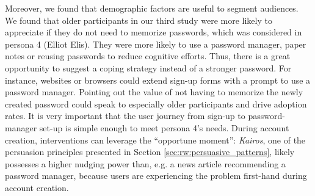 Moreover, we found that demographic factors are useful to segment audiences. We found that older participants in our third study were more likely to appreciate if they do not need to memorize passwords, which was considered in persona 4 (Elliot Elis). They were more likely to use a password manager, paper notes or reusing passwords to reduce cognitive efforts. Thus, there is a great opportunity to suggest a coping strategy instead of a stronger password. For instance, websites or browsers could extend sign-up forms with a prompt to use a password manager. Pointing out the value of not having to memorize the newly created password could speak to especially older participants and drive adoption rates. It is very important that the user journey from sign-up to password-manager set-up is simple enough to meet persona 4's needs. During account creation, interventions can leverage the ``opportune moment'': \textit{Kairos}, one of the persuasion principles presented in Section \ref{sec:rw:persuasive_patterns}, likely possesses a higher nudging power than, e.g. a news article recommending a password manager, because users are experiencing the problem first-hand during account creation. 




